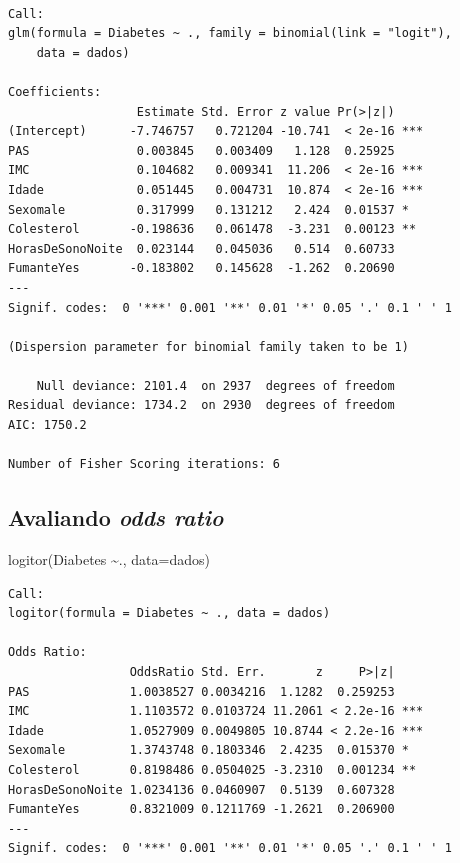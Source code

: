 \documentclass[
  letterpaper,
  DIV=11,
  numbers=noendperiod]{scrartcl}
\newenvironment{Shaded}{\begin{snugshade}}{\end{snugshade}}
\newcommand{\AttributeTok}[1]{\textcolor[rgb]{0.40,0.45,0.13}{#1}}
\newcommand{\FunctionTok}[1]{\textcolor[rgb]{0.28,0.35,0.67}{#1}}
\newcommand{\NormalTok}[1]{\textcolor[rgb]{0.00,0.23,0.31}{#1}}
\newcommand{\SpecialCharTok}[1]{\textcolor[rgb]{0.37,0.37,0.37}{#1}}
\begin{document}
\begin{verbatim}

Call:
glm(formula = Diabetes ~ ., family = binomial(link = "logit"), 
    data = dados)

Coefficients:
                  Estimate Std. Error z value Pr(>|z|)    
(Intercept)      -7.746757   0.721204 -10.741  < 2e-16 ***
PAS               0.003845   0.003409   1.128  0.25925    
IMC               0.104682   0.009341  11.206  < 2e-16 ***
Idade             0.051445   0.004731  10.874  < 2e-16 ***
Sexomale          0.317999   0.131212   2.424  0.01537 *  
Colesterol       -0.198636   0.061478  -3.231  0.00123 ** 
HorasDeSonoNoite  0.023144   0.045036   0.514  0.60733    
FumanteYes       -0.183802   0.145628  -1.262  0.20690    
---
Signif. codes:  0 '***' 0.001 '**' 0.01 '*' 0.05 '.' 0.1 ' ' 1

(Dispersion parameter for binomial family taken to be 1)

    Null deviance: 2101.4  on 2937  degrees of freedom
Residual deviance: 1734.2  on 2930  degrees of freedom
AIC: 1750.2

Number of Fisher Scoring iterations: 6
\end{verbatim}

\subsection{\texorpdfstring{Avaliando \emph{odds
ratio}}{Avaliando odds ratio}}\label{avaliando-odds-ratio}

\begin{Shaded}
\begin{Highlighting}[]
\FunctionTok{logitor}\NormalTok{(Diabetes }\SpecialCharTok{\textasciitilde{}}\NormalTok{., }\AttributeTok{data=}\NormalTok{dados)}
\end{Highlighting}
\end{Shaded}

\begin{verbatim}
Call:
logitor(formula = Diabetes ~ ., data = dados)

Odds Ratio:
                 OddsRatio Std. Err.       z     P>|z|    
PAS              1.0038527 0.0034216  1.1282  0.259253    
IMC              1.1103572 0.0103724 11.2061 < 2.2e-16 ***
Idade            1.0527909 0.0049805 10.8744 < 2.2e-16 ***
Sexomale         1.3743748 0.1803346  2.4235  0.015370 *  
Colesterol       0.8198486 0.0504025 -3.2310  0.001234 ** 
HorasDeSonoNoite 1.0234136 0.0460907  0.5139  0.607328    
FumanteYes       0.8321009 0.1211769 -1.2621  0.206900    
---
Signif. codes:  0 '***' 0.001 '**' 0.01 '*' 0.05 '.' 0.1 ' ' 1
\end{verbatim}
\end{document}
